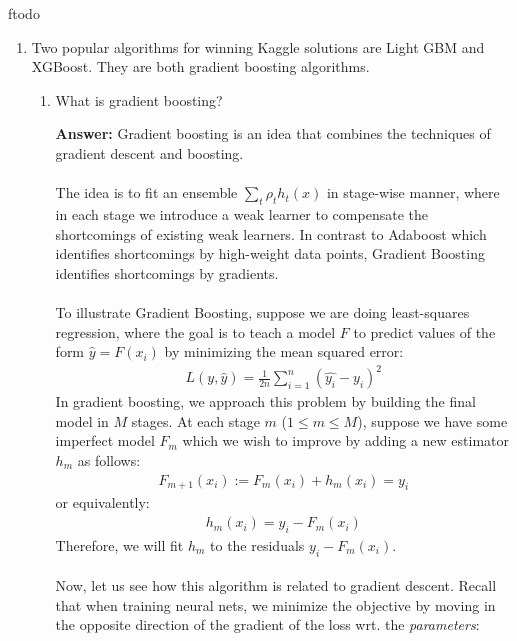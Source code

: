 ƒtodo\documentclass{article}
\newenvironment{QandA}{\begin{enumerate}[label=\arabic*.]}{\end{enumerate}}
\newenvironment{InnerQandA}{\begin{enumerate}[label=\roman*.]}{\end{enumerate}}
\newenvironment{answer}{\par\normalfont \textbf{Answer:}}{}
\begin{document}
\begin{QandA}
\begin{InnerQandA}
\begin{answer}
        (See more \href{https://www.youtube.com/watch?v=O2L2Uv9pdDA&ab_channel=StatQuestwithJoshStarmer}{here})
        \end{answer}
    \end{InnerQandA}

    \item Two popular algorithms for winning Kaggle solutions are Light GBM and XGBoost. They are both gradient boosting algorithms.
    \begin{InnerQandA}
        \item What is gradient boosting?
        \begin{answer}
            Gradient boosting is an idea that combines the techniques of gradient descent and boosting. \\\\
            The idea is to fit an ensemble $\sum_t \rho_t h_t(x)$ in stage-wise manner, where in each stage we introduce a weak learner to compensate the shortcomings of existing weak learners. In contrast to Adaboost which identifies shortcomings by high-weight data points, Gradient Boosting identifies shortcomings by gradients.\\\\
            To illustrate Gradient Boosting, suppose we are doing least-squares regression, where the goal is to teach a model $F$ to predict values of the form $\hat{y} = F(x_i)$ by minimizing the mean squared error:
            \begin{align*}
                L(y, \hat{y}) = \frac{1}{2n}\sum_{i=1}^n (\hat{y_i} - y_i)^2
            \end{align*}
            In gradient boosting, we approach this problem by building the final model in $M$ stages. At each stage $m$ ($1 \le m \le M$), suppose we have some imperfect model $F_m$ which we wish to improve by adding a new estimator $h_m$ as follows:
            \begin{align*}
                F_{m+1}(x_i) := F_m(x_i) + h_m(x_i) = y_i 
            \end{align*}
            or equivalently:
            \begin{align*}
                h_m(x_i) = y_i - F_m(x_i)
            \end{align*}
            Therefore, we will fit $h_m$ to the residuals $y_i - F_m(x_i)$. \\\\
            Now, let us see how this algorithm is related to gradient descent. Recall that when training neural nets, we minimize the objective by moving in the opposite direction of the gradient of the loss wrt. the \textit{parameters}:

\end{answer}
\end{InnerQandA}
\end{QandA}
\end{document}
